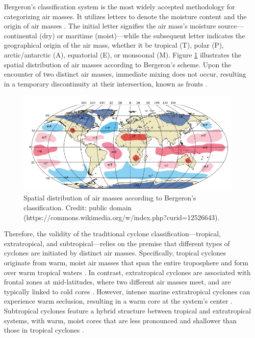Bergeron's classification system is the most widely accepted methodology for categorizing air masses. It utilizes letters to denote the moisture content and the origin of air masses \citep{spiridonov2021fundamentals}. The initial letter signifies the air mass's moisture source—continental (dry) or maritime (moist)—while the subsequent letter indicates the geographical origin of the air mass, whether it be tropical (T), polar (P), arctic/antarctic (A), equatorial (E), or monsoonal (M). Figure \ref{massas_Bergeron} illustrates the spatial distribution of air masses according to Bergeron's scheme. Upon the encounter of two distinct air masses, immediate mixing does not occur, resulting in a temporary discontinuity at their intersection, known as fronts \citep{spiridonov2021fundamentals,donald2015meteorology}.

\begin{figure}[h]
\begin{center}
\setcaptionmargin{1cm}
\includegraphics[width=0.7\columnwidth,angle=0]{fig/Air_masses.svg.png}
\caption[Air Masses]{Spatial distribution of air masses according to Bergeron's classification. Credit: public domain (https://commons.wikimedia.org/w/index.php?curid=12526643).} 
\label{massas_Bergeron}
\end{center}
\end{figure}

Therefore, the validity of the traditional cyclone classification—tropical, extratropical, and subtropical—relies on the premise that different types of cyclones are initiated by distinct air masses. Specifically, tropical cyclones originate from warm, moist air masses that span the entire troposphere and form over warm tropical waters \citep{gray1968global, frank1977structurea, ramage1959hurricane, riehl1948formation}. In contrast, extratropical cyclones are associated with frontal zones at mid-latitudes, where two different air masses meet, and are typically linked to cold cores \citep{bjerknes1944theory, shapiro1990fronts,hart2003cyclone}. However, intense marine extratropical cyclones can experience warm seclusion, resulting in a warm core at the system's center \citep{hart2003cyclone,shapiro1990fronts}. Subtropical cyclones feature a hybrid structure between tropical and extratropical systems, with warm, moist cores that are less pronounced and shallower than those in tropical cyclones \citep{hart2003cyclone}.

